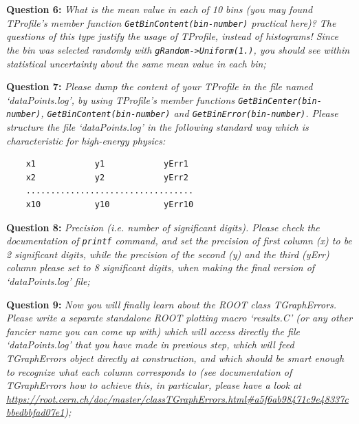 \documentclass[11pt]{article}
\begin{document}
\bigskip

\noindent\textbf{Question 6:} {\it What is the mean value in each of 10 bins (you may found TProfile's member function \verb|GetBinContent(bin-number)| practical here)? The questions of this type justify the usage of TProfile, instead of histograms! Since the bin was selected randomly with \verb|gRandom->Uniform(1.)|, you should see within statistical uncertainty about the same mean value in each bin;} 

\bigskip

\noindent\textbf{Question 7:} {\it Please dump the content of your TProfile in the file named `dataPoints.log', by using TProfile's member functions \verb|GetBinCenter(bin-number)|, \verb|GetBinContent(bin-number)| and \verb|GetBinError(bin-number)|. Please structure the file `dataPoints.log' in the following standard way which is characteristic for high-energy physics:} 
{\small
\begin{verbatim}
    x1            y1            yErr1
    x2            y2            yErr2
    ..................................
    x10           y10           yErr10
\end{verbatim}
}

\bigskip

\noindent\textbf{Question 8:} {\it Precision (i.e. number of significant digits). Please check the documentation of \verb|printf| command, and set the precision of first column (x) to be 2 significant digits, while the precision of the second (y) and the third (yErr) column please set to 8 significant digits, when making the final version of `dataPoints.log' file;}

\bigskip

\noindent\textbf{Question 9:} {\it Now you will finally learn about the ROOT class TGraphErrors. Please write a separate standalone ROOT plotting macro `results.C' (or any other fancier name you can come up with) which will access directly the file `dataPoints.log' that you have made in previous step, which will feed TGraphErrors object directly at construction, and which should be smart enough to recognize what each column corresponds to (see documentation of TGraphErrors how to achieve this, in particular, please have a look at \url{https://root.cern.ch/doc/master/classTGraphErrors.html#a5f6ab98471c9e48337cbbedbbfad07e1}); }
\end{document}
